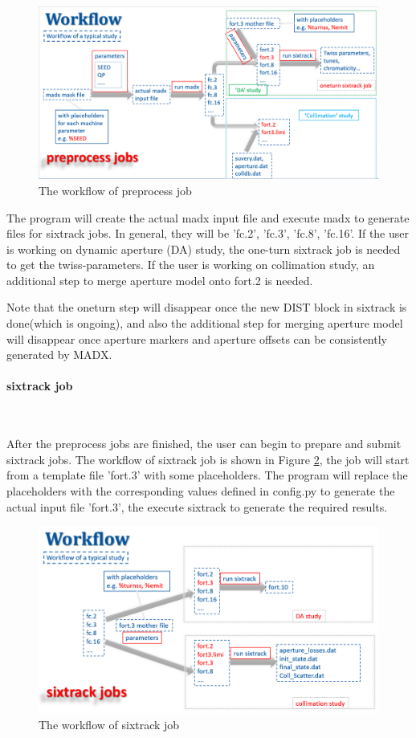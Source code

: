 \begin{figure}[h]
\includegraphics[width=17cm]{preprocess.png}
\caption{The workflow of preprocess job}
\label{fig1}
\centering
\end{figure}

The program will create the actual madx input file and execute madx to generate files for sixtrack jobs. In general, they will be 'fc.2', 'fc.3', 'fc.8', 'fc.16'. If the user is working on dynamic aperture (DA) study, the one-turn sixtrack job is needed to get the twiss-parameters. If the user is working on collimation study, an additional step to merge aperture model onto fort.2 is needed.

Note that the oneturn step will disappear once the new DIST block in sixtrack is done(which is ongoing), and also the additional step for merging aperture model will disappear once aperture markers and aperture offsets can be consistently generated by MADX.


\paragraph{sixtrack job}~

After the preprocess jobs are finished, the user can begin to prepare and submit sixtrack jobs. The workflow of sixtrack job is shown in Figure \ref{fig2}, the job will start from a template file 'fort.3' with some placeholders. The program will replace the placeholders with the corresponding values defined in config.py to generate the actual input file 'fort.3', the execute sixtrack to generate the required results.
\begin{figure}[h]
\includegraphics[width=17cm]{sixtrack.png}
\caption{The workflow of sixtrack job}
\label{fig2}
\centering
\end{figure}


